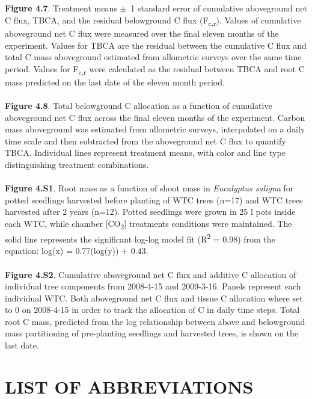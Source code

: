 \documentclass[a4paper]{article}\usepackage[]{graphicx}\usepackage[]{color}
\begin{document}
\\
\\
\textbf{Figure 4.7}. Treatment means $\pm$~1 standard error of cumulative aboveground net C flux, TBCA, and the residual belowground C flux (F\textsubscript{c,r}). Values of cumulative aboveground net C flux were measured over the final eleven months of the experiment. Values for TBCA are the residual between the cumulative C flux and total C mass aboveground estimated from allometric surveys over the same time period. Values for F\textsubscript{c,r} were calculated as the residual between TBCA and root C mass predicted on the last date of the eleven month period. 
\\
\\
\textbf{Figure 4.8}. Total belowground C allocation as a function of cumulative aboveground net C flux across the final eleven months of the experiment. Carbon mass aboveground was estimated from allometric surveys, interpolated on a daily time scale and then subtracted from the aboveground net C flux to quantify TBCA. Individual lines represent treatment means, with color and line type distinguishing treatment combinations.
\\
\\
\textbf{Figure 4.S1}.
Root mass as a function of shoot mass in \textit{Eucalyptus saligna} for potted seedlings harvested before planting of WTC trees (n=17) and WTC trees harvested after 2 years (n=12). Potted seedlings were grown in 25 l pots inside each WTC, while chamber [CO\textsubscript{2}] treatments conditions were maintained. The solid line represents the significant log-log model fit (R\textsuperscript{2} = 0.98) from the equation: log(x) = 0.77(log(y)) + 0.43.
\\
\\
\textbf{Figure 4.S2}.
Cumulative aboveground net C flux and additive C allocation of individual tree components from 2008-4-15 and 2009-3-16. Panels represent each individual WTC. Both aboveground net C flux and tissue C allocation where set to 0 on 2008-4-15 in order to track the allocation of C in daily time steps. Total root C mass, predicted from the log relationship between above and belowground mass partitioning of pre-planting seedlings and harvested trees, is shown on the last date.

\clearpage
\section*{LIST OF ABBREVIATIONS}
\end{document}
